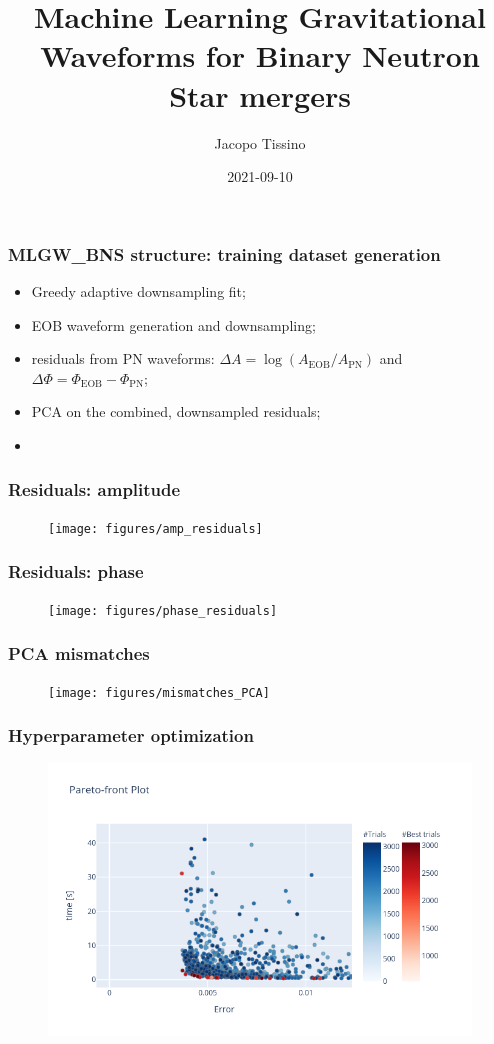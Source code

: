 \documentclass{beamer}
\title{Machine Learning Gravitational Waveforms for Binary Neutron Star mergers}
\author{Jacopo Tissino}
\date{2021-09-10}
\begin{document}
\frame{\titlepage}

\begin{frame}
    \frametitle{MLGW\_BNS structure: training dataset generation}
    \begin{itemize}
    \item Greedy adaptive downsampling fit;
    \item EOB waveform generation and downsampling;
    \item residuals from PN waveforms: \(\Delta A = \log (A _{\text{EOB}}/ A _{\text{PN}})\) and \(\Delta \Phi = \Phi _{\text{EOB}} - \Phi _{\text{PN}}\);
    \item PCA on the combined, downsampled residuals;
    \item 
    \end{itemize}
\end{frame}

\begin{frame}
    \frametitle{Residuals: amplitude}
    \begin{figure}[ht]
    \centering
    \texttt{[image: figures/amp\_residuals]}
    \label{fig:amp_residuals}
    \end{figure}
\end{frame}

\begin{frame}
    \frametitle{Residuals: phase}
    \begin{figure}[ht]
    \centering
    \texttt{[image: figures/phase\_residuals]}
    \label{fig:phase_residuals}
    \end{figure}
\end{frame}

\begin{frame}
    \frametitle{PCA mismatches}
    \begin{figure}[ht]
    \centering
    \texttt{[image: figures/mismatches\_PCA]}
    \label{fig:mismatches_PCA}
    \end{figure}
\end{frame}

\begin{frame}
    \frametitle{Hyperparameter optimization}
    \begin{figure}[ht]
    \centering
    \includegraphics[width=\textwidth]{figures/pareto-front-nonspinning}
    \label{fig:pareto-front-nonspinning}
    \end{figure}
\end{frame}
\end{document}
